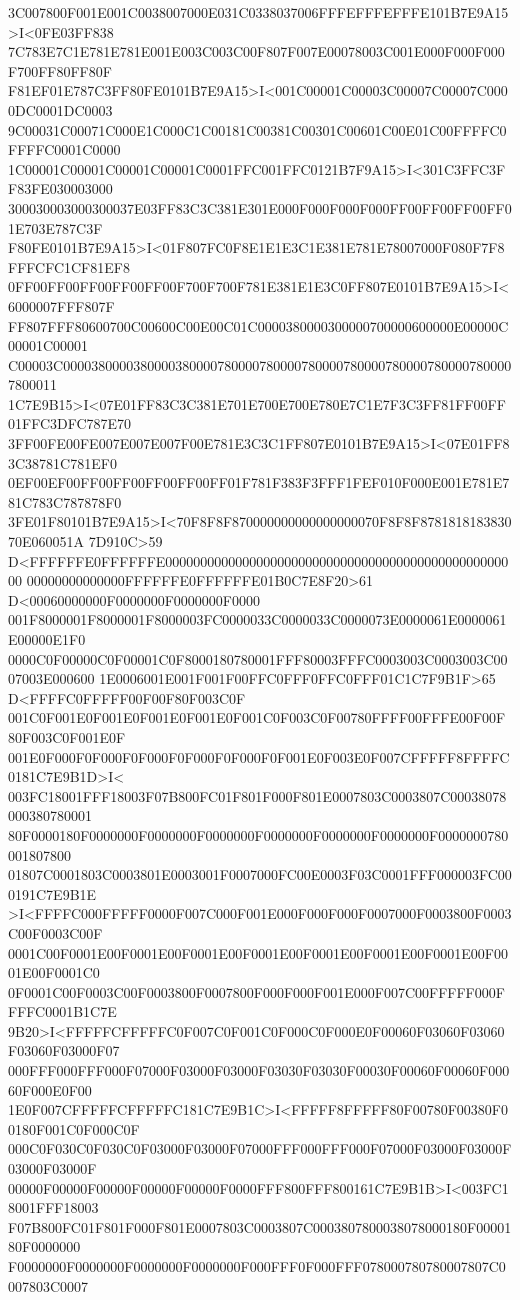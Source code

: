 3C007800F001E001C0038007000E031C0338037006FFFEFFFEFFFE101B7E9A15>I<0FE03FF838
7C783E7C1E781E781E001E003C003C00F807F007E00078003C001E000F000F000F700FF80FF80F
F81EF01E787C3FF80FE0101B7E9A15>I<001C00001C00003C00007C00007C0000DC0001DC0003
9C00031C00071C000E1C000C1C00181C00381C00301C00601C00E01C00FFFFC0FFFFC0001C0000
1C00001C00001C00001C00001C0001FFC001FFC0121B7F9A15>I<301C3FFC3FF83FE030003000
300030003000300037E03FF83C3C381E301E000F000F000F000FF00FF00FF00FF01E703E787C3F
F80FE0101B7E9A15>I<01F807FC0F8E1E1E3C1E381E781E78007000F080F7F8FFFCFC1CF81EF8
0FF00FF00FF00FF00FF00F700F700F781E381E1E3C0FF807E0101B7E9A15>I<6000007FFF807F
FF807FFF80600700C00600C00E00C01C0000380000300000700000600000E00000C00001C00001
C00003C00003800003800003800007800007800007800007800007800007800007800007800011
1C7E9B15>I<07E01FF83C3C381E701E700E700E780E7C1E7F3C3FF81FF00FF01FFC3DFC787E70
3FF00FE00FE007E007E007F00E781E3C3C1FF807E0101B7E9A15>I<07E01FF83C38781C781EF0
0EF00EF00FF00FF00FF00FF00FF01F781F383F3FFF1FEF010F000E001E781E781C783C787878F0
3FE01F80101B7E9A15>I<70F8F8F870000000000000000070F8F8F878181818383070E060051A
7D910C>59 D<FFFFFFE0FFFFFFE000000000000000000000000000000000000000000000000000
00000000000000FFFFFFE0FFFFFFE01B0C7E8F20>61 D<00060000000F0000000F0000000F0000
001F8000001F8000001F8000003FC0000033C0000033C0000073E0000061E0000061E00000E1F0
0000C0F00000C0F00001C0F8000180780001FFF80003FFFC0003003C0003003C0007003E000600
1E0006001E001F001F00FFC0FFF0FFC0FFF01C1C7F9B1F>65 D<FFFFC0FFFFF00F00F80F003C0F
001C0F001E0F001E0F001E0F001E0F001C0F003C0F00780FFFF00FFFE00F00F80F003C0F001E0F
001E0F000F0F000F0F000F0F000F0F000F0F001E0F003E0F007CFFFFF8FFFFC0181C7E9B1D>I<
003FC18001FFF18003F07B800FC01F801F000F801E0007803C0003807C00038078000380780001
80F0000180F0000000F0000000F0000000F0000000F0000000F0000000F0000000780001807800
01807C0001803C0003801E0003001F0007000FC00E0003F03C0001FFF000003FC000191C7E9B1E
>I<FFFFC000FFFFF0000F007C000F001E000F000F000F0007000F0003800F0003C00F0003C00F
0001C00F0001E00F0001E00F0001E00F0001E00F0001E00F0001E00F0001E00F0001E00F0001C0
0F0001C00F0003C00F0003800F0007800F000F000F001E000F007C00FFFFF000FFFFC0001B1C7E
9B20>I<FFFFFCFFFFFC0F007C0F001C0F000C0F000E0F00060F03060F03060F03060F03000F07
000FFF000FFF000F07000F03000F03000F03030F03030F00030F00060F00060F00060F000E0F00
1E0F007CFFFFFCFFFFFC181C7E9B1C>I<FFFFF8FFFFF80F00780F00380F00180F001C0F000C0F
000C0F030C0F030C0F03000F03000F07000FFF000FFF000F07000F03000F03000F03000F03000F
00000F00000F00000F00000F00000F0000FFF800FFF800161C7E9B1B>I<003FC18001FFF18003
F07B800FC01F801F000F801E0007803C0003807C0003807800038078000180F0000180F0000000
F0000000F0000000F0000000F0000000F000FFF0F000FFF078000780780007807C0007803C0007
